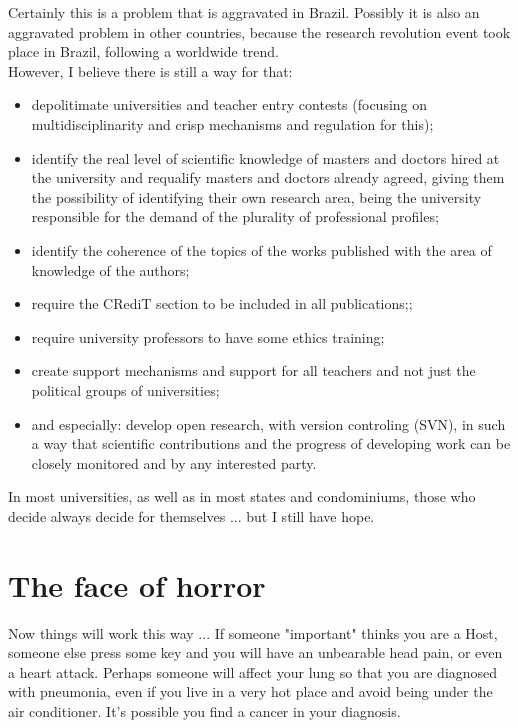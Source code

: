 \documentclass[11pt]{book}
\begin{document}
 \noindent Certainly this is a problem that is aggravated in Brazil. Possibly it is also an aggravated problem in other countries, because the research revolution event took place in Brazil, following a worldwide trend. \\
 
 \noindent However, I believe there is still a way for that:
 
 \begin{itemize}
 \item depolitimate universities and teacher entry contests (focusing on multidisciplinarity and crisp mechanisms and regulation for this);
 \item identify the real level of scientific knowledge of masters and doctors hired at the university and requalify masters and doctors already agreed, giving them the possibility of identifying their own research area, being the university responsible for the demand of the plurality of professional profiles;
 \item identify the coherence of the topics of the works published with the area of knowledge of the authors;
 \item require the CRediT section to be included in all publications;;
 \item require university professors to have some ethics training;
 \item create support mechanisms and support for all teachers and not just the political groups of universities;
 \item and especially: develop open research, with version controling (SVN), in such a way that scientific contributions and the progress of developing work can be closely monitored and by any interested party.
 \end{itemize}
 
 \noindent In most universities, as well as in most states and condominiums, those who decide always decide for themselves ... but I still have hope.
 
\chapter{The face of horror}

\noindent Now things will work this way ... If someone "important" thinks you are a Host, someone else press some key and you will have an unbearable head pain, or even a heart attack. Perhaps someone will affect your lung so that you are diagnosed with pneumonia, even if you live in a very hot place and avoid being under the air conditioner. It's possible you find a cancer in your diagnosis. \\
\end{document}
